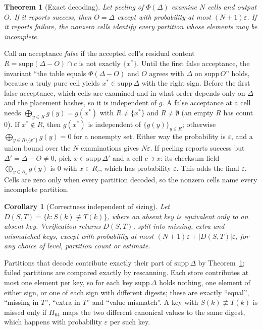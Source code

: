 \documentclass[conference]{IEEEtran}
\newtheorem{theorem}{Theorem}
\newtheorem{corollary}{Corollary}
\begin{document}
\begin{theorem}[Exact decoding]\label{thm:decode}
Let peeling of $\Phi(\Delta)$ examine $N$ cells and output $O$. If it reports success, then $O=\Delta$ except with probability at most $(N+1)\varepsilon$. If it reports failure, the nonzero cells identify every partition whose elements may be incomplete.
\end{theorem}
\begin{IEEEproof}
Call an acceptance \emph{false} if the accepted cell's residual content $R=\mathrm{supp}(\Delta-O)\cap c$ is not exactly $\{x^\ast\}$. Until the first false acceptance, the invariant ``the table equals $\Phi(\Delta-O)$ and $O$ agrees with $\Delta$ on $\mathrm{supp}\,O$'' holds, because a truly pure cell yields $x^\ast\in\mathrm{supp}\,\Delta$ with the right sign. Before the first false acceptance, which cells are examined and in what order depends only on $\Delta$ and the placement hashes, so it is independent of $g$. A false acceptance at a cell needs $\bigoplus_{y\in R}g(y)=g(x^\ast)$ with $R\neq\{x^\ast\}$ and $R\neq\emptyset$ (an empty $R$ has count $0$). If $x^\ast\notin R$, then $g(x^\ast)$ is independent of $\{g(y)\}_{y\in R}$; otherwise $\bigoplus_{y\in R\setminus\{x^\ast\}}g(y)=0$ for a nonempty set. Either way the probability is $\varepsilon$, and a union bound over the $N$ examinations gives $N\varepsilon$. If peeling reports success but $\Delta'=\Delta-O\neq0$, pick $x\in\mathrm{supp}\,\Delta'$ and a cell $c\ni x$: its checksum field $\bigoplus_{y\in R_c}g(y)$ is $0$ with $x\in R_c$, which has probability $\varepsilon$. This adds the final $\varepsilon$. Cells are zero only when every partition decoded, so the nonzero cells name every incomplete partition.
\end{IEEEproof}

\begin{corollary}[Correctness independent of sizing]\label{cor:exact}
Let $D(S,T)=\{k: S(k)\not\equiv T(k)\}$, where an absent key is equivalent only to an absent key. Verification returns $D(S,T)$, split into missing, extra and mismatched keys, except with probability at most $(N+1)\varepsilon+|D(S,T)|\varepsilon$, for any choice of level, partition count or estimate.
\end{corollary}
\begin{IEEEproof}
Partitions that decode contribute exactly their part of $\mathrm{supp}\,\Delta$ by Theorem~\ref{thm:decode}; failed partitions are compared exactly by rescanning. Each store contributes at most one element per key, so for each key $\mathrm{supp}\,\Delta$ holds nothing, one element of either sign, or one of each sign with different digests; these are exactly ``equal'', ``missing in $T$'', ``extra in $T$'' and ``value mismatch''. A key with $S(k)\not\equiv T(k)$ is missed only if $H_{64}$ maps the two different canonical values to the same digest, which happens with probability $\varepsilon$ per such key.
\end{IEEEproof}
\end{document}
